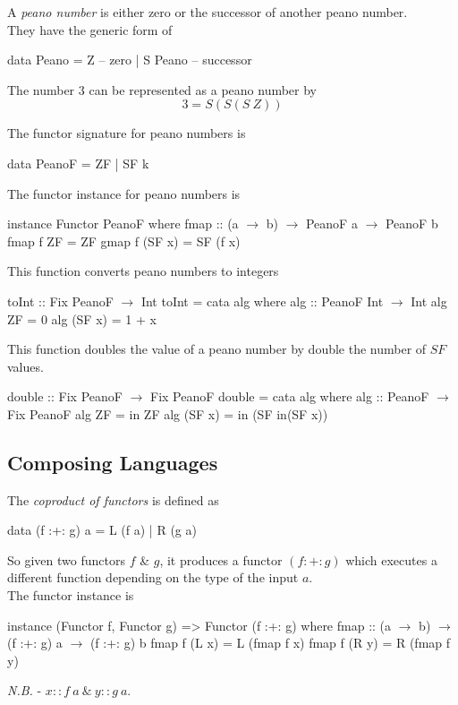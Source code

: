 \documentclass[11pt,a4paper]{article}
\begin{document}
A \textit{peano number} is either zero or the successor of another peano number.\\
They have the generic form of
\begin{code}
data Peano = Z          -- zero
           | S Peano    -- successor
\end{code}

The number $3$ can be represented as a peano number by
$$3 = S(S(S\ Z))$$

The functor signature for peano numbers is
\begin{code}
data PeanoF = ZF
            | SF k
\end{code}
The functor instance for peano numbers is
\begin{code}
instance Functor PeanoF where
  fmap :: (a $\to$ b) $\to$ PeanoF a $\to$ PeanoF b
  fmap f ZF     = ZF
  gmap f (SF x) = SF (f x)
\end{code}

This function converts peano numbers to integers
\begin{code}
toInt :: Fix PeanoF $\to$ Int
toInt = cata alg
  where
    alg :: PeanoF Int $\to$ Int
    alg ZF     = 0
    alg (SF x) = 1 + x
\end{code}

This function doubles the value of a peano number by double the number of $SF$ values.
\begin{code}
double :: Fix PeanoF $\to$ Fix PeanoF
double = cata alg
  where
    alg :: PeanoF $\to$ Fix PeanoF
    alg ZF     = in ZF
    alg (SF x) = in (SF in(SF x))
\end{code}

\subsection{Composing Languages}

The \textit{coproduct of functors} is defined as
\begin{code}
data (f :+: g) a = L (f a)
                 | R (g a)
\end{code}
So given two functors $f$ \& $g$, it produces a functor $(f :+: g)$ which executes a different function depending on the type of the input $a$.\\
The functor instance is
\begin{code}
instance (Functor f, Functor g) => Functor (f :+: g) where
  fmap :: (a $\to$ b) $\to$ (f :+: g) a $\to$ (f :+: g) b
  fmap f (L x) = L (fmap f x)
  fmap f (R y) = R (fmap f y)
\end{code}
\textit{N.B.} - $x :: f\ a\ \&\ y :: g\ a$.
\end{document}
